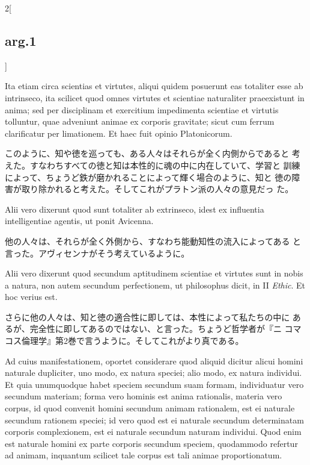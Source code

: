 \documentclass[paper=a4paper,fontsize=10pt,jafontsize=9pt,titlepage]{jlreq}
\begin{document}
\begin{paracol}{2}[\subsection{arg.1}]
\switchcolumn*

Ita etiam circa scientias et virtutes, aliqui quidem posuerunt eas
 totaliter esse ab intrinseco, ita scilicet quod omnes virtutes et
 scientiae naturaliter praeexistunt in anima; sed per disciplinam et
 exercitium impedimenta scientiae et virtutis tolluntur, quae
 adveniunt animae ex corporis gravitate; sicut cum ferrum clarificatur
 per limationem. Et haec fuit opinio Platonicorum.

\switchcolumn

このように、知や徳を巡っても、ある人々はそれらが全く内側からであると
 考えた。すなわちすべての徳と知は本性的に魂の中に内在していて、学習と
 訓練によって、ちょうど鉄が磨かれることによって輝く場合のように、知と
 徳の障害が取り除かれると考えた。そしてこれがプラトン派の人々の意見だっ
 た。

\switchcolumn*

Alii vero dixerunt quod sunt totaliter ab extrinseco, idest ex
 influentia intelligentiae agentis, ut ponit Avicenna.

\switchcolumn

他の人々は、それらが全く外側から、すなわち能動知性の流入によってある
 と言った。アヴィセンナがそう考えているように。

\switchcolumn*

Alii vero dixerunt quod secundum aptitudinem scientiae et virtutes
 sunt in nobis a natura, non autem secundum perfectionem, ut
 philosophus dicit, in II {\itshape Ethic}. Et hoc verius est.

\switchcolumn

さらに他の人々は、知と徳の適合性に即しては、本性によって私たちの中に
 あるが、完全性に即してあるのではない、と言った。ちょうど哲学者が『ニ
 コマコス倫理学』第2巻で言うように。そしてこれがより真である。

\switchcolumn*

Ad cuius manifestationem, oportet considerare quod aliquid dicitur
 alicui homini naturale dupliciter, uno modo, ex natura speciei; alio
 modo, ex natura individui. Et quia unumquodque habet speciem secundum
 suam formam, individuatur vero secundum materiam; forma vero hominis
 est anima rationalis, materia vero corpus, id quod convenit homini
 secundum animam rationalem, est ei naturale secundum rationem
 speciei; id vero quod est ei naturale secundum determinatam corporis
 complexionem, est ei naturale secundum naturam individui. Quod enim
 est naturale homini ex parte corporis secundum speciem, quodammodo
 refertur ad animam, inquantum scilicet tale corpus est tali animae
 proportionatum.


\end{paracol}
\end{document}
